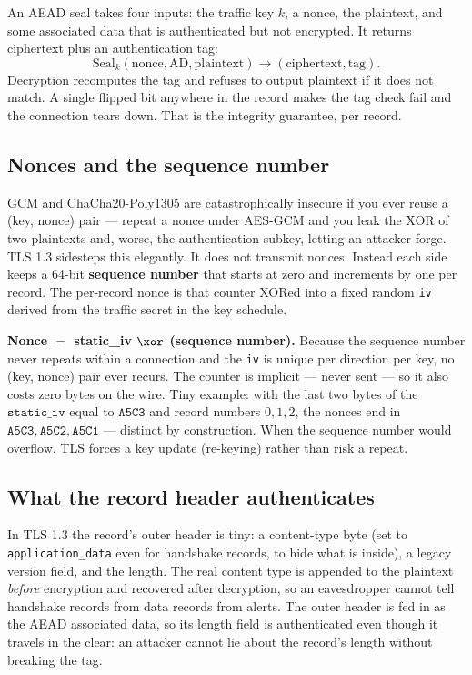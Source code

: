 An AEAD seal takes four inputs: the traffic key $k$, a nonce, the plaintext, and
some associated data that is authenticated but not encrypted. It returns
ciphertext plus an authentication tag:
\[
\mathrm{Seal}_k(\text{nonce}, \text{AD}, \text{plaintext}) \to (\text{ciphertext},
\text{tag}).
\]
Decryption recomputes the tag and refuses to output plaintext if it does not
match. A single flipped bit anywhere in the record makes the tag check fail and
the connection tears down. That is the integrity guarantee, per record.

\subsection{Nonces and the sequence number}

GCM and ChaCha20-Poly1305 are catastrophically insecure if you ever reuse a
(key, nonce) pair --- repeat a nonce under AES-GCM and you leak the XOR of two
plaintexts and, worse, the authentication subkey, letting an attacker forge. TLS
1.3 sidesteps this elegantly. It does not transmit nonces. Instead each side keeps
a 64-bit \textbf{sequence number} that starts at zero and increments by one per
record. The per-record nonce is that counter XORed into a fixed random
\texttt{iv} derived from the traffic secret in the key schedule.

\begin{focusbox}
\textbf{Nonce $=$ static\_iv $\xor$ (sequence number).} Because the sequence number
never repeats within a connection and the \texttt{iv} is unique per direction per
key, no (key, nonce) pair ever recurs. The counter is implicit --- never sent --- so
it also costs zero bytes on the wire. Tiny example: with the last two bytes of the
$\mathtt{static\_iv}$ equal to $\mathtt{A5C3}$ and record numbers $0,1,2$, the
nonces end in $\mathtt{A5C3}, \mathtt{A5C2}, \mathtt{A5C1}$ --- distinct by
construction. When the sequence number would overflow, TLS forces a key update
(re-keying) rather than risk a repeat.
\end{focusbox}

\subsection{What the record header authenticates}

In TLS 1.3 the record's outer header is tiny: a content-type byte (set to
\texttt{application\_data} even for handshake records, to hide what is inside), a
legacy version field, and the length. The real content type is appended to the
plaintext \emph{before} encryption and recovered after decryption, so an
eavesdropper cannot tell handshake records from data records from alerts. The outer
header is fed in as the AEAD associated data, so its length field is authenticated
even though it travels in the clear: an attacker cannot lie about the record's
length without breaking the tag.

